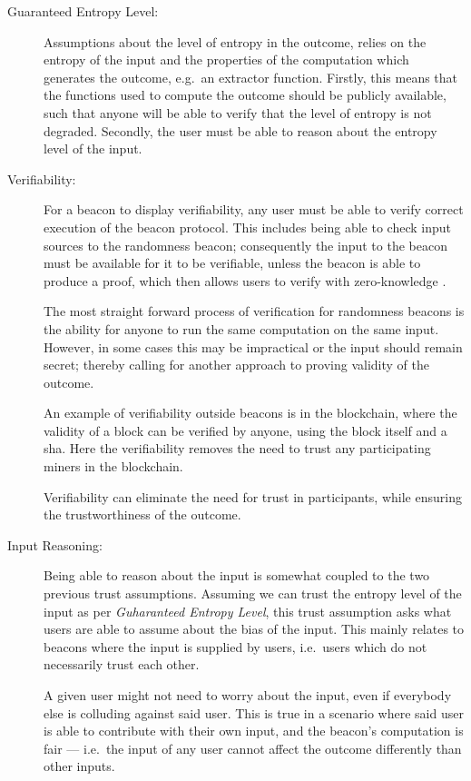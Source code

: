 \begin{description}

    \item [Guaranteed Entropy Level:]
        Assumptions about the level of entropy in the outcome, relies on the entropy of the input and the properties of the computation which generates the outcome, e.g.\ an extractor function.
        Firstly, this means that the functions used to compute the outcome should be publicly available, such that anyone will be able to verify that the level of entropy is not degraded.
        Secondly, the user must be able to reason about the entropy level of the input.

    \item [Verifiability:]
        For a beacon to display verifiability, any user must be able to verify correct execution of the beacon protocol.
        This includes being able to check input sources to the randomness beacon;
        consequently the input to the beacon must be available for it to be verifiable, unless the beacon is able to produce a proof, which then allows users to verify with zero-knowledge .

        The most straight forward process of verification for randomness beacons is the ability for anyone to run the same computation on the same input.
        However, in some cases this may be impractical or the input should remain secret; thereby calling for another approach to proving validity of the outcome.

        An example of verifiability outside beacons is in the blockchain, where the validity of a block can be verified by anyone, using the block itself and a \acrfull{sha}.
        Here the verifiability removes the need to trust any participating miners in the blockchain.

        Verifiability can eliminate the need for trust in participants, while ensuring the trustworthiness of the outcome.

    \item [Input Reasoning:]
        Being able to reason about the input is somewhat coupled to the two previous trust assumptions.
        Assuming we can trust the entropy level of the input as per \emph{Guharanteed Entropy Level}, this trust assumption asks what users are able to assume about the bias of the input.
        This mainly relates to beacons where the input is supplied by users, i.e.\ users which do not necessarily trust each other.

        A given user might not need to worry about the input, even if everybody else is colluding against said user.
        This is true in a scenario where said user is able to contribute with their own input, and the beacon's computation is fair
        --- i.e.\ the input of any user cannot affect the outcome differently than other inputs.

\end{description}


